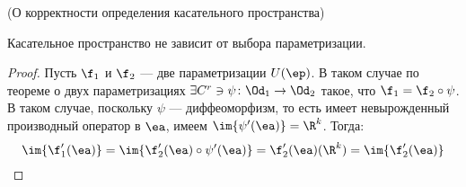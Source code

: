 \begin{theorem}(О корректности определения касательного пространства)

    Касательное пространство не зависит от выбора параметризации.
\end{theorem}
\begin{proof}
    Пусть $\f_1$ и $\f_2$ --- две параметризации $U(\ep)$. В таком случае по
    теореме о двух параметризациях $\exists C^r \ni \psi \colon \Od_1 \to \Od_2$
    такое, что $\f_1 = \f_2 \circ \psi$. В таком случае, поскольку
    $\psi$ --- диффеоморфизм, то есть имеет невырожденный производный оператор
    в $\ea$, имеем $\im{\psi'(\ea)} = \R^k$. Тогда:
\[
    \im{\f'_1(\ea)} = \im{\f'_2(\ea) \circ \psi'(\ea)} = \f'_2(\ea)(\R^k) = \im{\f'_2(\ea)}
\]
\end{proof}

